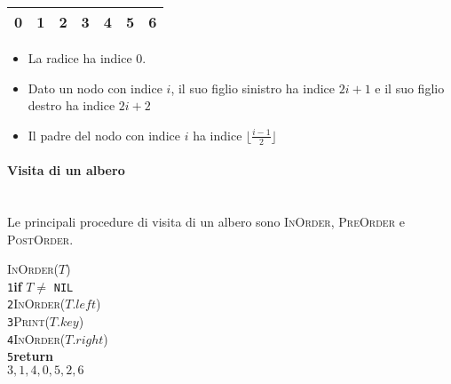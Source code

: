 \documentclass[10pt,landscape]{article}
\newcommand{\myparagraph}[1]{\paragraph{#1}\mbox{}\\ [5pt]}
\begin{document}
\begin{multicols*}{4}
\begin{multicols}{2}
\begin{center}
                                \renewcommand\arraystretch{1.5}
                                \begin{tabular}{|c|c|c|c|c|c|c|}
                                        \hline
                                        \multicolumn{1}{|c|}{0} & \multicolumn{1}{c|}{1} & \multicolumn{1}{c|}{2} & \multicolumn{1}{c|}{3} & \multicolumn{1}{c|}{4} & \multicolumn{1}{c|}{5} & \multicolumn{1}{c|}{6} \\
                                        \hline
                                \end{tabular}
                        \end{center}
                        \begin{itemize}[left=0pt, label=\raisebox{0.5ex}{\tiny$\bullet$}]
                                \item La radice ha indice 0.
                                \item Dato un nodo con indice $i$, il suo figlio sinistro ha indice $2i+1$ e il suo figlio destro ha indice $2i+2$
                                \item Il padre del nodo con indice $i$ ha indice $\lfloor\frac{i-1}{2}\rfloor$
                        \end{itemize}
                \end{multicols}
                \myparagraph{Visita di un albero}
                Le principali procedure di visita di un albero sono \textsc{InOrder}, \textsc{PreOrder} e \textsc{PostOrder}.
                \begin{multicols}{3}
                        \textsc{InOrder($T$)}\\ [3pt]
                        \verb|1|\hspace*{0.5em}\textbf{if} $T \neq$ \verb|NIL|\\
                        \verb|2|\hspace*{1.2em}\textsc{InOrder($T.left$)}\\
                        \verb|3|\hspace*{1.2em}\textsc{Print($T.key$)}\\
                        \verb|4|\hspace*{1.2em}\textsc{InOrder($T.right$)}\\
                        \verb|5|\hspace*{0.5em}\textbf{return}\\ [5pt]
                        $3,1,4,0,5,2,6$\\

\end{multicols}
\end{multicols*}
\end{document}
